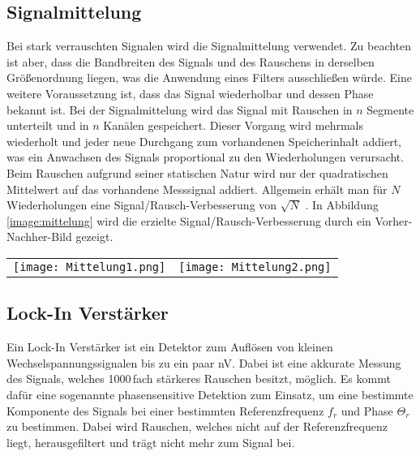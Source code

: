 \subsection{Signalmittelung}
\label{sub:mittelung}
Bei stark verrauschten Signalen wird die Signalmittelung verwendet. Zu beachten ist aber, dass die Bandbreiten des Signals und des Rauschens in derselben Größenordnung liegen, was die Anwendung eines Filters ausschließen würde. Eine weitere Voraussetzung ist, dass das Signal wiederholbar und dessen Phase bekannt ist. Bei der Signalmittelung wird das Signal mit Rauschen in $n$ Segmente unterteilt und in $n$ Kanälen gespeichert. Dieser Vorgang wird mehrmals wiederholt und jeder neue Durchgang zum vorhandenen Speicherinhalt addiert, was ein Anwachsen des Signals proportional zu den Wiederholungen verursacht. Beim Rauschen aufgrund seiner statischen Natur wird nur der quadratischen Mittelwert auf das vorhandene Messsignal addiert. Allgemein erhält man für $N$ Wiederholungen eine Signal/Rausch-Verbesserung von $\sqrt{N}$ \citep{VA}. In Abbildung \ref{image:mittelung} wird die erzielte Signal/Rausch-Verbesserung durch ein Vorher-Nachher-Bild gezeigt.
\begin{center}
    \begin{tabular}{c c}
        \texttt{[image: Mittelung1.png]} &
        \texttt{[image: Mittelung2.png]}  
    \end{tabular}
    \label{image:mittelung}
\end{center}
\newpage
\subsection{Lock-In Verstärker}
\label{sub:lockin}
Ein Lock-In Verstärker ist ein Detektor zum Auflösen von kleinen Wechselspannungssignalen bis zu ein paar nV. Dabei ist eine akkurate Messung des Signals, welches 1000\,fach stärkeres Rauschen besitzt, möglich. Es kommt dafür eine sogenannte phasensensitive Detektion zum Einsatz, um eine bestimmte Komponente des Signals bei einer bestimmten Referenzfrequenz $f_{r}$ und Phase $\Theta_{r}$ zu bestimmen. Dabei wird Rauschen, welches nicht auf der Referenzfrequenz liegt, herausgefiltert und trägt nicht mehr zum Signal bei.
